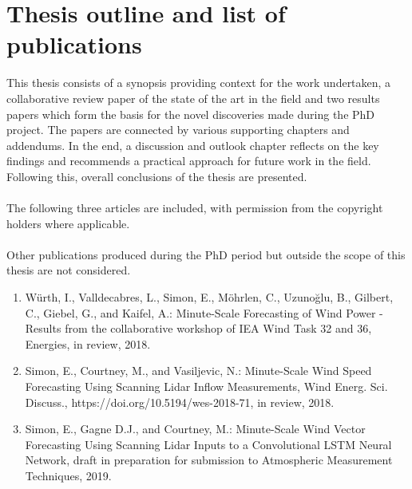 \chapter{Thesis outline and list of publications}
\label{sec:outline}


This thesis consists of a synopsis providing context for the work undertaken, a collaborative review paper of the state of the art in the field and two results papers which form the basis for the novel discoveries made during the PhD project. The papers are connected by various supporting chapters and addendums. In the end, a discussion and outlook chapter reflects on the key findings and recommends a practical approach for future work in the field. Following this, overall conclusions of the thesis are presented.
\\\\
The following three articles are included, with permission from the copyright holders where applicable. 
\\\\
Other publications produced during the PhD period but outside the scope of this thesis are not considered.
\\
\begin{enumerate}
    \item W\"urth, I., Valldecabres, L., Simon, E., M\"ohrlen, C., Uzuno\u glu, B., Gilbert, C., Giebel, G., and Kaifel, A.: Minute-Scale Forecasting of Wind Power - Results from the collaborative workshop of IEA Wind Task 32 and 36, Energies, in review, 2018.
    
    \item Simon, E., Courtney, M., and Vasiljevic, N.: Minute-Scale Wind Speed Forecasting Using Scanning Lidar Inflow Measurements, Wind Energ. Sci. Discuss., https://doi.org/10.5194/wes-2018-71, in review, 2018.
    
    \item Simon, E., Gagne D.J., and Courtney, M.: Minute-Scale Wind Vector Forecasting Using Scanning Lidar Inputs to a Convolutional LSTM Neural Network, draft in preparation for submission to Atmospheric Measurement Techniques, 2019.
    
\end{enumerate}